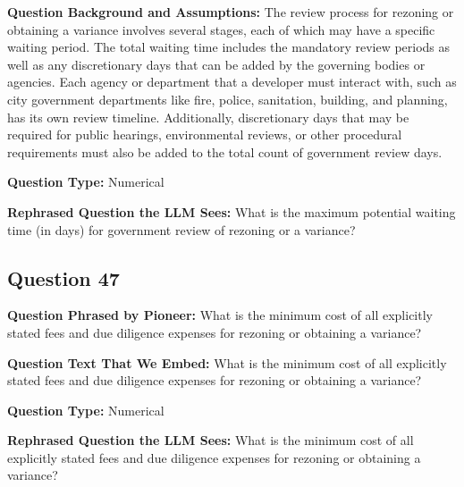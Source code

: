 \noindent\textbf{Question Background and Assumptions:} The review process for rezoning or obtaining a variance involves several stages, each of which may have a specific waiting period. The total waiting time includes the mandatory review periods as well as any discretionary days that can be added by the governing bodies or agencies. Each agency or department that a developer must interact with, such as city government departments like fire, police, sanitation, building, and planning, has its own review timeline. Additionally, discretionary days that may be required for public hearings, environmental reviews, or other procedural requirements must also be added to the total count of government review days.

\noindent\textbf{Question Type:} Numerical

\noindent\textbf{Rephrased Question the LLM Sees:} What is the maximum potential waiting time (in days) for government review of rezoning or a variance?

\vspace{1cm}
\subsection*{Question 47}
\noindent\textbf{Question Phrased by Pioneer:} What is the minimum cost of all explicitly stated fees and due diligence expenses for rezoning or obtaining a variance?

\noindent\textbf{Question Text That We Embed:} What is the minimum cost of all explicitly stated fees and due diligence expenses for rezoning or obtaining a variance?

\noindent\textbf{Question Type:} Numerical

\noindent\textbf{Rephrased Question the LLM Sees:} What is the minimum cost of all explicitly stated fees and due diligence expenses for rezoning or obtaining a variance?

\vspace{1cm}

